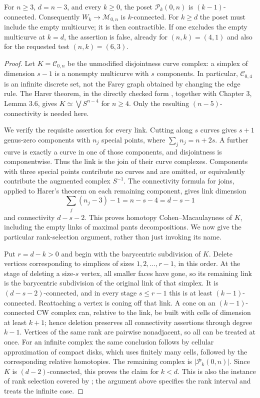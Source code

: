 \begin{theorem}\label{P5b2}
For $n\ge3$, $d=n-3$, and every $k\ge0$, the poset
$\mathcal P_k(0,n)$ is $(k-1)$-connected.  Consequently
$W_k\to\mathcal M_{0,n}$ is $k$-connected.
For $k\ge d$ the poset must include the empty multicurve; it is
then contractible.  If one excludes the empty multicurve at
$k=d$, the assertion is false, already for $(n,k)=(4,1)$ and
also for the requested test $(n,k)=(6,3)$.
\end{theorem}
\begin{proof}
Let $K=\mathcal C_{0,n}$ be the unmodified disjointness curve
complex: a simplex of dimension $s-1$ is a nonempty multicurve
with $s$ components.  In particular, $\mathcal C_{0,4}$ is an
infinite discrete set, not the Farey graph obtained by changing
the edge rule.  The Harer theorem, in the directly checked form
\citet[Chapter 4, Theorem 4.1]{Harer1988}, together with Chapter 3,
Lemma 3.6, gives $K\simeq\bigvee S^{n-4}$ for $n\ge4$.
Only the resulting $(n-5)$-connectivity is needed here.

We verify the requisite assertion for every link.  Cutting along
$s$ curves gives $s+1$ genus-zero components with $n_j$ special
points, where $\sum_j n_j=n+2s$.  A further curve is exactly a
curve in one of those components, and disjointness is componentwise.
Thus the link is the join of their curve complexes.  Components
with three special points contribute no curves and are omitted,
or equivalently contribute the augmented complex $S^{-1}$.
The connectivity formula for joins, applied to Harer's theorem
on each remaining component, gives link dimension
\[
 \sum_j(n_j-3)-1=n-s-4=d-s-1
\]
and connectivity $d-s-2$.  This proves homotopy
Cohen--Macaulayness of $K$, including the empty links of maximal
pants decompositions.  We now give the particular rank-selection
argument, rather than just invoking its name.

Put $r=d-k>0$ and begin with the barycentric subdivision of $K$.
Delete vertices corresponding to simplices of sizes
$1,2,\ldots,r-1$, in this order.  At the stage of deleting a
size-$s$ vertex, all smaller faces have gone, so its remaining
link is the barycentric subdivision of the original link of
that simplex.  It is $(d-s-2)$-connected, and in every stage
$s\le r-1$ this is at least $(k-1)$-connected.  Reattaching a
vertex is coning off that link.  A cone on an $(k-1)$-connected
CW complex can, relative to the link, be built with cells of
dimension at least $k+1$; hence deletion preserves all
connectivity assertions through degree $k-1$.
Vertices of the same rank are pairwise nonadjacent, so all can
be treated at once.  For an infinite complex the same conclusion
follows by cellular approximation of compact disks, which uses
finitely many cells, followed by the corresponding relative
homotopies.  The remaining complex is $|\mathcal P_k(0,n)|$.
Since $K$ is $(d-2)$-connected, this proves the claim for $k<d$.
This is also the instance of rank selection covered by
\citet[Corollary 4.4]{BjornerWachsWelker2009}; the argument
above specifies the rank interval and treats the infinite case.


\end{proof}
